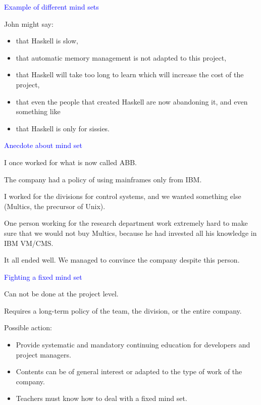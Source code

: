 \documentclass{slides}
\newcommand{\ti}[1]{\begin{center}\Large{\textcolor{blue}{#1}}\end{center}}
\begin{document}
\begin{slide}\ti{Example of different mind sets}

John might say:
\begin{itemize}
\item that Haskell is slow,
\item that automatic memory management is not adapted to this project,
\item that Haskell will take too long to learn which will increase the
  cost of the project,
\item that even the people that created Haskell are now abandoning it,
  and even something like
\item that Haskell is only for sissies.
\end{itemize}

\vfill\end{slide}
\begin{slide}\ti{Anecdote about mind set}

I once worked for what is now called ABB.

The company had a policy of using mainframes only from IBM.

I worked for the divisions for control systems, and we wanted
something else (Multics, the precursor of Unix).

One person working for the research department work extremely hard to
make sure that we would not buy Multics, because he had invested all
his knowledge in IBM VM/CMS.

It all ended well.  We managed to convince the company despite this
person.

\vfill\end{slide}
\begin{slide}\ti{Fighting a fixed mind set}

Can not be done at the project level.

Requires a long-term policy of the team, the division, or the entire
company.

Possible action:

\begin{itemize}
\item Provide systematic and mandatory continuing education for
  developers and project managers.
\item Contents can be of general interest or adapted to the type of
  work of the company.
\item Teachers must know how to deal with a fixed mind set.
\end{itemize}

\vfill\end{slide}
\end{document}
